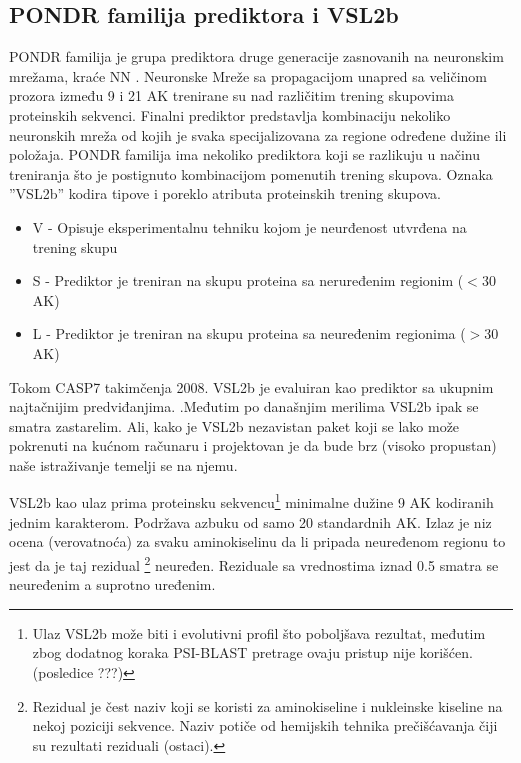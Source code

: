 \subsection{PONDR familija prediktora i VSL2b}
\label{VSL2b}

PONDR familija  je grupa
prediktora druge generacije zasnovanih na neuronskim mrežama, kraće NN .
Neuronske Mreže sa propagacijom unapred  sa veličinom
prozora između 9 i 21 AK trenirane su nad različitim trening skupovima
proteinskih sekvenci.  Finalni prediktor predstavlja kombinaciju nekoliko
neuronskih mreža od kojih je svaka specijalizovana za regione određene dužine
ili položaja.  PONDR familija ima nekoliko prediktora koji  se razlikuju u
načinu treniranja što je postignuto kombinacijom pomenutih trening skupova.
Oznaka ''VSL2b'' kodira tipove i poreklo atributa proteinskih trening skupova.
\begin{itemize}
  \item V - Opisuje eksperimentalnu tehniku kojom je neurđenost utvrđena na
    trening skupu 
  \item S - Prediktor je treniran na skupu proteina sa 
      neruređenim regionim ($<30$ AK)
  \item L - Prediktor je treniran na skupu proteina sa 
    neuređenim regionima ($>30$ AK)
\end{itemize}

Tokom CASP7 takimčenja 2008. VSL2b je evaluiran kao prediktor sa ukupnim najtačnijim predviđanjima\parencite{bohe2009}.
.Međutim po današnjim merilima \parencite{meng2017} VSL2b ipak se smatra
zastarelim.  Ali, kako je VSL2b nezavistan paket koji se lako može pokrenuti na
kućnom računaru i projektovan je da bude brz (visoko propustan) naše
istraživanje temelji se na njemu.

VSL2b kao ulaz prima proteinsku sekvencu\footnote{
Ulaz VSL2b može biti i evolutivni profil što poboljšava rezultat,  međutim zbog
dodatnog koraka PSI-BLAST pretrage ovaju pristup nije korišćen.
(posledice ???)
}
minimalne dužine 9 AK kodiranih jednim
karakterom. Podržava azbuku od samo 20 standardnih AK.  Izlaz je niz
ocena (verovatnoća) za svaku aminokiselinu da li pripada neuređenom regionu to
jest da je taj rezidual
\footnote{ Rezidual je čest naziv koji se koristi za aminokiseline i nukleinske
  kiseline na nekoj poziciji sekvence.  Naziv potiče od hemijskih tehnika
  prečišćavanja čiji su rezultati reziduali (ostaci).
} neuređen. Reziduale sa vrednostima iznad 0.5 smatra se neuređenim a suprotno
uređenim.





